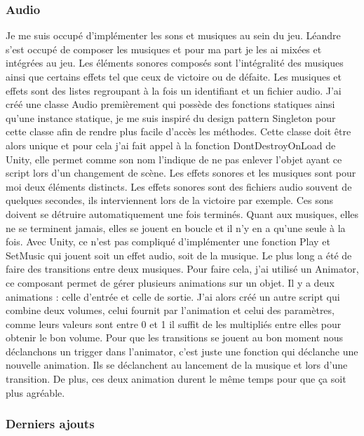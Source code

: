 \documentclass{article}
\begin{document}
\subsubsection{Audio}

Je me suis occupé d'implémenter les sons et musiques au sein du jeu. Léandre s'est occupé de composer les musiques et pour ma part je les ai mixées et intégrées au jeu. Les éléments sonores composés sont l'intégralité des musiques ainsi que certains effets tel que ceux de victoire ou de défaite.
Les musiques et effets sont des listes regroupant à la fois un identifiant et un fichier audio. J'ai créé une classe Audio premièrement qui possède des fonctions statiques ainsi qu'une instance statique, je me suis inspiré du design pattern Singleton pour cette classe afin de rendre plus facile d'accès les méthodes. Cette classe doit être alors unique et pour cela j'ai fait appel à la fonction DontDestroyOnLoad de Unity, elle permet comme son nom l'indique de ne pas enlever l'objet ayant ce script lors d'un changement de scène. Les effets sonores et les musiques sont pour moi deux éléments distincts. Les effets sonores sont des fichiers audio souvent de quelques secondes, ils interviennent lors de la victoire par exemple. Ces sons doivent se détruire automatiquement une fois terminés. Quant aux musiques, elles ne se terminent jamais, elles se jouent en boucle et il n'y en a qu'une seule à la fois. Avec Unity, ce n'est pas compliqué d'implémenter une fonction Play et SetMusic qui jouent soit un effet audio, soit de la musique. Le plus long a été de faire des transitions entre deux musiques.
Pour faire cela, j'ai utilisé un Animator, ce composant permet de gérer plusieurs animations sur un objet. Il y a deux animations : celle d'entrée et celle de sortie. J'ai alors créé un autre script qui combine deux volumes, celui fournit par l'animation et celui des paramètres, comme leurs valeurs sont entre 0 et 1 il suffit de les multipliés entre elles pour obtenir le bon volume. Pour que les transitions se jouent au bon moment nous déclanchons un trigger dans l'animator, c'est juste une fonction qui déclanche une nouvelle animation. Ils se déclanchent au lancement de la musique et lors d'une transition. De plus, ces deux animation durent le même temps pour que ça soit plus agréable.


\newpage
\subsubsection{Derniers ajouts}
\end{document}
